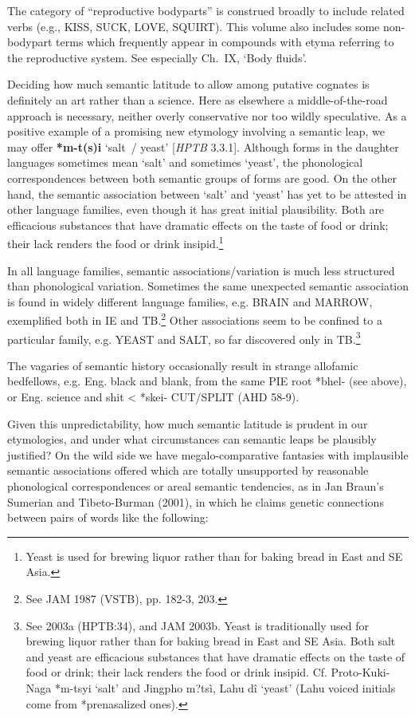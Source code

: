 The category of “reproductive bodyparts” is construed broadly to include
related verbs (e.g., KISS, SUCK, LOVE, SQUIRT). This volume also includes some
non-bodypart terms which frequently appear in compounds with etyma referring to
the reproductive system.  See especially Ch.~IX, ‘Body fluids’.


Deciding how much semantic latitude to allow among putative cognates is
definitely an art rather than a science. Here as elsewhere a middle-of-the-road
approach is necessary, neither overly conservative nor too wildly speculative.
As a positive example of a promising new etymology involving a semantic leap, we
may offer \textbf{*m-t(s)i} ‘salt~/ yeast’ [\textit{HPTB} 3.3.1].  Although forms in the daughter
languages sometimes mean ‘salt’ and sometimes ‘yeast’, the phonological
correspondences between both semantic groups of forms are good.  On the other
hand, the semantic association between ‘salt’ and ‘yeast’ has yet to be attested
in other language families, even though it has great initial plausibility. Both
are efficacious substances that have dramatic effects on the taste of food or
drink; their lack renders the food or drink insipid.\footnote{Yeast is used for
brewing liquor rather than for baking bread in East and SE Asia.}

In all language families, semantic associations/variation is much less structured than phonological variation. Sometimes the same unexpected semantic association is found in widely different language families, e.g. BRAIN and MARROW, exemplified both in IE and TB.\footnote{See JAM 1987 (VSTB), pp. 182-3, 203.} Other associations seem to be confined to a particular family, e.g. YEAST and SALT, so far discovered only in TB.\footnote{See 2003a (HPTB:34), and JAM 2003b. Yeast is traditionally used for brewing liquor rather than for baking bread in East and SE Asia. Both salt and yeast are efficacious substances that have dramatic effects on the taste of food or drink; their lack renders the food or drink insipid. Cf. Proto-Kuki-Naga *m-tsyi ‘salt’ and Jingpho m?tsì, Lahu dî ‘yeast’ (Lahu voiced initials come from *prenasalized ones).}

The vagaries of semantic history occasionally result in strange allofamic bedfellows, e.g. Eng. black and blank, from the same PIE root *bhel- (see above), or Eng. science and shit < *skei- CUT/SPLIT (AHD 58-9).

Given this unpredictability, how much semantic latitude is prudent in
our etymologies, and under what circumstances can semantic leaps be
plausibly justified? On the wild side we have megalo-comparative
fantasies with implausible semantic associations offered which are
totally unsupported by reasonable phonological correspondences or
areal semantic tendencies, as in Jan Braun’s Sumerian and
Tibeto-Burman (2001), in which he claims genetic connections between
pairs of words like the following:

